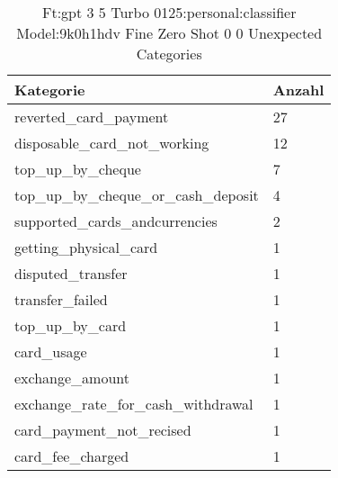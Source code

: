 
    \begin{table}[!ht]
        \centering
        \begin{tabularx}{\textwidth}{X X}
\toprule
\textbf{Kategorie} & \textbf{Anzahl} \\
\midrule
reverted\_card\_payment & \num{27} \\
disposable\_card\_not\_working & \num{12} \\
top\_up\_by\_cheque & \num{7} \\
top\_up\_by\_cheque\_or\_cash\_deposit & \num{4} \\
supported\_cards\_andcurrencies & \num{2} \\
getting\_physical\_card & \num{1} \\
disputed\_transfer & \num{1} \\
transfer\_failed & \num{1} \\
top\_up\_by\_card & \num{1} \\
card\_usage & \num{1} \\
exchange\_amount & \num{1} \\
exchange\_rate\_for\_cash\_withdrawal & \num{1} \\
card\_payment\_not\_recised & \num{1} \\
card\_fee\_charged & \num{1} \\
\bottomrule
\end{tabularx}

        \caption{Ft:gpt 3 5 Turbo 0125:personal:classifier Model:9k0h1hdv Fine Zero Shot 0 0 Unexpected Categories}
        \label{tab:ft:gpt-3-5-turbo-0125:personal:classifier-model:9k0H1hdV-fine-zero-shot-0-0-unexpected-categories}
    \end{table}
    